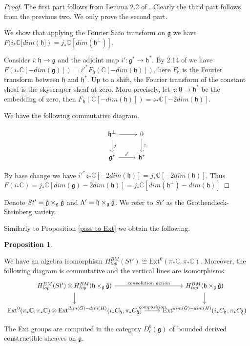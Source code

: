 \documentclass[12pt]{article}
\newcommand{\C}{\mathbb{C}}
\theoremstyle{plain}
\theoremstyle{definition}
\newtheorem{prop}[theorem]{Proposition}
\begin{document}
\begin{proof}
    The first part follows from Lemma 2.2 of \cite{Achar_2013}. Clearly the third part follows from the previous two. We only prove the second part.

    We show that applying the Fourier Sato transform on $\mathfrak{g}$ we have $F(i_*\C[dim(\mathfrak{h}])=j_*\C[dim(\mathfrak{h}^\perp)]$. 

    Consider $i:\mathfrak{h}\rightarrow\mathfrak{g}$ and the adjoint map $i':\mathfrak{g}^*\rightarrow\mathfrak{h}^*$. By 2.14 of \cite{Achar_2013} we have $F(i_*\C[-dim(\mathfrak{g})])=i'^*F_{\mathfrak{h}}(\C[-dim(\mathfrak{h})])$, here $F_{\mathfrak{h}}$ is the Fourier transform between $\mathfrak{h}$ and $\mathfrak{h}^*$. Up to a shift, the Fourier transform of the constant sheaf is the skyscraper sheaf at zero. More precisely, let $z:0\rightarrow \mathfrak{h}^*$ be the embedding of zero, then $F_{\mathfrak{h}}(\C[-dim(\mathfrak{h})])=z_*\C[-2dim(\mathfrak{h})]$. 

    We have the following commutative diagram. 

        \[
    \begin{tikzcd}
\mathfrak{h}^\perp 
    \arrow[r,] 
    \arrow[d,"j"]
& 0  
    \arrow[d,"z"] \\
\mathfrak{g}^* 
    \arrow[r,"i'"] 
& \mathfrak{h}^*
\end{tikzcd}
\]

By base change we have $i'^*z_*\C[-2dim(\mathfrak{h})]=j_*\C[-2dim(\mathfrak{h})]$. Thus $F(i_*\C)=j_*\C[dim(\mathfrak{g})-2dim(\mathfrak{h})]=j_*\C[dim(\mathfrak{h}^\perp)-dim(\mathfrak{h})]$
\end{proof}

Denote $St'=\Tilde{\mathfrak{g}}\times_{\mathfrak{g}} \Tilde{\mathfrak{g}}$ and $\Lambda'=\mathfrak{h}\times_{\mathfrak{g}}\Tilde{\mathfrak{g}}$. We refer to $St'$ as the Grothendieck-Steinberg variety. 

Similarly to Proposition \ref{pass to Ext} we obtain the following.

\begin{prop}\label{pass to Ext again}

We have an algebra isomorphism $H^{BM}_{top}(St')\cong \text{Ext}^{0}(\pi_*\C, \pi_*\C)$. Moreover, the following diagram is commutative and the vertical lines are isomorphisms.
    \[
    \begin{tikzcd}
H^{BM}_{top}(St') \otimes H^{BM}_{top}(\mathfrak{h}\times_{\mathfrak{g}}\Tilde{\mathfrak{g}}) 
    \arrow[r, "\textit{convolution action}"] 
    \arrow[d]
& H^{BM}_{top}(\mathfrak{h}\times_{\mathfrak{g}}\Tilde{\mathfrak{g}}) 
    \arrow[d] \\
\text{Ext}^{0}(\pi_*\C, \pi_*\C) \otimes \text{Ext}^{dim(G)-dim(H)}(i_*C_{\mathfrak{h}},\pi_*C_{\Tilde{\mathfrak{g}}})
    \arrow[r, "\textit{composition}"] 
& \text{Ext}^{dim(G)-dim(H)}(i_*C_{\mathfrak{h}},\pi_*C_{\Tilde{\mathfrak{g}}})
\end{tikzcd}
\]

The Ext groups are computed in the category ${D_c^b(\mathfrak{g})}$ of bounded derived constructible sheaves on $\mathfrak{g}$.

\end{prop}
\end{document}
